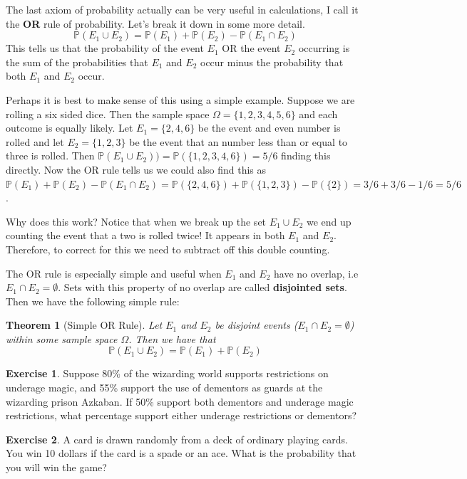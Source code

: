 \documentclass[
]{book}
\newcommand{\prob}[1]{{\mathbb{P}(#1)}}
\newtheorem{theorem}{Theorem}[chapter]
\theoremstyle{definition}
\theoremstyle{definition}
\theoremstyle{definition}
\newtheorem{exercise}{Exercise}[chapter]
\theoremstyle{definition}
\theoremstyle{remark}
\begin{document}
The last axiom of probability actually can be very useful in calculations, I call it the \textbf{OR} rule of probability. Let's break it down in some more detail.
\[\prob{E_1 \cup E_2}=\prob{E_1}+\prob{E_2}-\prob{E_1 \cap E_2}\]
This tells us that the probability of the event \(E_1\) OR the event \(E_2\) occurring is the sum of the probabilities that \(E_1\) and \(E_2\) occur minus the probability that both \(E_1\) and \(E_2\) occur.

Perhaps it is best to make sense of this using a simple example. Suppose we are rolling a six sided dice. Then the sample space \(\Omega=\{1,2,3,4,5,6\}\) and each outcome is equally likely. Let \(E_1=\{2,4,6\}\) be the event and even number is rolled and let \(E_2=\{1,2,3\}\) be the event that an number less than or equal to three is rolled. Then \(\prob{E_1\cup E_2)}=\prob{\{1,2,3,4,6\}}=5/6\) finding this directly. Now the OR rule tells us we could also find this as \(\prob{E_1}+\prob{E_2}-\prob{E_1 \cap E_2}=\prob{\{2,4,6\}}+\prob{\{1,2,3\}}-\prob{\{2\}}=3/6+3/6-1/6=5/6\).

Why does this work? Notice that when we break up the set \(E_1 \cup E_2\) we end up counting the event that a two is rolled twice! It appears in both \(E_1\) and \(E_2\). Therefore, to correct for this we need to subtract off this double counting.

The OR rule is especially simple and useful when \(E_1\) and \(E_2\) have no overlap, i.e \(E_1 \cap E_2=\emptyset\). Sets with this property of no overlap are called \textbf{disjointed sets}. Then we have the following simple rule:

\begin{theorem}[Simple OR Rule]
\protect\hypertarget{thm:unnamed-chunk-226}{}\label{thm:unnamed-chunk-226}Let \(E_1\) and \(E_2\) be disjoint events (\(E_1 \cap E_2=\emptyset\)) within some sample space \(\Omega\). Then we have that \[\prob{E_1 \cup E_2}=\prob{E_1}+\prob{E_2}\]
\end{theorem}

\begin{exercise}
\protect\hypertarget{exr:unnamed-chunk-227}{}\label{exr:unnamed-chunk-227}Suppose 80\% of the wizarding world supports restrictions on underage magic, and 55\% support the use of dementors as guards at the wizarding prison Azkaban. If 50\% support both dementors and underage magic restrictions, what percentage support either underage restrictions or dementors?
\end{exercise}

\begin{exercise}
\protect\hypertarget{exr:unnamed-chunk-228}{}\label{exr:unnamed-chunk-228}A card is drawn randomly from a deck of ordinary playing cards. You win 10 dollars if the card is a spade or an ace. What is the probability that you will win the game?
\end{exercise}
\end{document}
